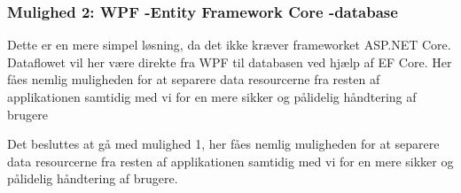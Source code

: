 \subsubsection{Mulighed 2: WPF -\g Entity Framework Core -\g database}
Dette er en mere simpel løsning, da det ikke kræver frameworket ASP.NET Core. Dataflowet vil her være direkte fra WPF til databasen ved hjælp af EF Core. Her fåes nemlig muligheden for at separere data resourcerne fra resten af applikationen samtidig med vi for en mere sikker og pålidelig håndtering af brugere

Det besluttes at gå med mulighed 1, her fåes nemlig muligheden for at separere data resourcerne fra resten af applikationen samtidig med vi for en mere sikker og pålidelig håndtering af brugere.







